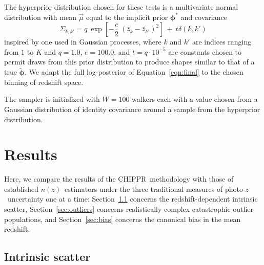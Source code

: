 \documentclass[iop]{emulateapj}
\newcommand{\todo}[3]{{\color{#2}\emph{#1}: #3}}
\newcommand{\que}[1]{\todo{Question}{cyan}{#1}}
\newcommand{\Sect}[1]{Section~\ref{#1}}
\newcommand{\Eq}[1]{Equation~\ref{#1}}
\newcommand{\Fig}[1]{Figure~\ref{#1}}
\newcommand{\project}[1]{\textsc{#1}}
\newcommand{\Chippr}{\project{CHIPPR}}%
\newcommand{\pz}{photo-$z$}
\newcommand{\nz}{$n(z)$}
\newcommand{\bvec}[1]{\ensuremath{\boldsymbol{#1}}}%
\newcommand{\ndphi}{\bvec{\phi}}
\begin{document}
The hyperprior distribution chosen for these tests is a multivariate normal distribution with mean $\vec{\mu}$ equal to the implicit prior $\ndphi^{*}$ and covariance
\begin{equation}
\label{eqn:priorcov}
\Sigma_{k,k'} = q\ \exp[-\frac{e}{2}\ (\bar{z}_{k}-\bar{z}_{k'})^{2}]\ +\ t\delta(k,k')
\end{equation}
inspired by one used in Gaussian processes, where $k$ and $k'$ are indices ranging from $1$ to $K$ and $q=1.0$, $e=100.0$, and $t=q\cdot10^{-5}$ are constants chosen to permit draws from this prior distribution to produce shapes similar to that of a true $\tilde{\ndphi}$.
We adapt the full log-posterior of \Eq{eqn:final} to the chosen binning of redshift space.


The sampler is initialized with $W=100$ walkers each with a value chosen from a Gaussian distribution of identity covariance around a sample from the hyperprior distribution.

\section{Results}
\label{sec:alldata}

Here, we compare the results of the \Chippr\ methodology with those of established \nz\ estimators under the three traditional measures of \pz\ uncertainty one at a time:
\Sect{sec:scatter} concerns the redshift-dependent intrinsic scatter, \Sect{sec:outliers} concerns realistically complex catastrophic outlier populations, and \Sect{sec:bias} concerns the canonical bias in the mean redshift.

\subsection{Intrinsic scatter}
\label{sec:scatter}

\end{document}

